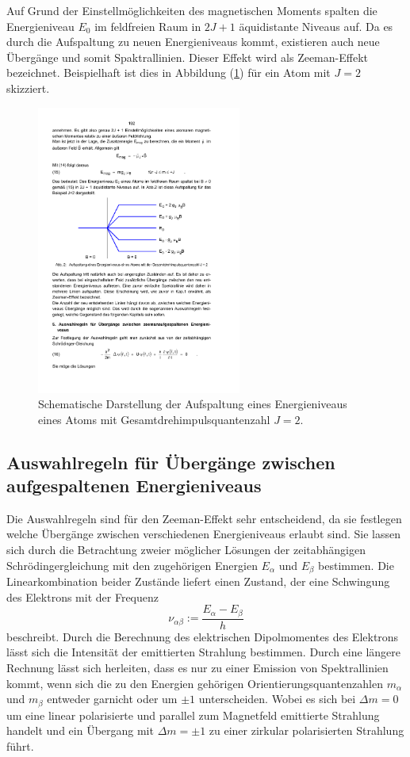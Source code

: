 Auf Grund der Einstellmöglichkeiten des magnetischen Moments spalten die Energieniveau
$E_0$ im feldfreien Raum in $2J+1$ äquidistante Niveaus auf. Da es durch die Aufspaltung
zu neuen Energieniveaus kommt, existieren auch neue Übergänge und somit Spaktrallinien.
Dieser Effekt wird als Zeeman-Effekt bezeichnet.
Beispielhaft ist dies in Abbildung (\ref{fig:aufspaltung}) für ein Atom mit $J=2$
skizziert.
\begin{figure}
    \centering
    \includegraphics[width=0.6\textwidth]{graphics/aufspaltung.pdf}
    \caption{Schematische Darstellung der Aufspaltung eines Energieniveaus eines Atoms
    mit Gesamtdrehimpulsquantenzahl $J=2$.}
    \label{fig:aufspaltung}
\end{figure}

\subsection{Auswahlregeln für Übergänge zwischen aufgespaltenen Energieniveaus}
\label{sec:auswahl}
Die Auswahlregeln sind für den Zeeman-Effekt sehr entscheidend, da sie festlegen welche
Übergänge zwischen verschiedenen Energieniveaus erlaubt sind.
Sie lassen sich durch die Betrachtung zweier möglicher Lösungen der zeitabhängigen
Schrödingergleichung mit den zugehörigen Energien $E_{\alpha}$ und $E_{\beta}$ bestimmen.
Die Linearkombination beider Zustände liefert einen Zustand, der eine Schwingung des
Elektrons mit der Frequenz
\begin{equation}
    \nu_{\alpha\beta}:=\frac{E_{\alpha}-E_{\beta}}{h}
\end{equation}
beschreibt.
Durch die Berechnung des elektrischen Dipolmomentes des Elektrons lässt sich die Intensität
der emittierten Strahlung bestimmen. Durch eine längere Rechnung lässt sich herleiten, dass
es nur zu einer Emission von Spektrallinien kommt, wenn sich die zu den Energien
gehörigen Orientierungsquantenzahlen $m_{\alpha}$ und $m_{\beta}$ entweder garnicht
oder um $\pm 1$ unterscheiden. Wobei es sich bei $\Delta m=0$ um eine linear
polarisierte und parallel zum Magnetfeld emittierte Strahlung handelt und
ein Übergang mit $\Delta m=\pm1$ zu einer zirkular polarisierten Strahlung führt.

